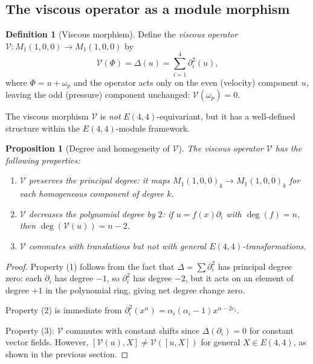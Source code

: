 \documentclass[reqno,10pt]{amsart}
\theoremstyle{plain}
\newtheorem{proposition}[theorem]{Proposition}
\theoremstyle{definition}
\newtheorem{definition}[theorem]{Definition}
\def\gE{E(4,4)}
\begin{document}
\subsection{The viscous operator as a module morphism}

\begin{definition}[Viscous morphism]
Define the \emph{viscous operator} $\mathcal{V}: M_1(1,0,0) \to M_1(1,0,0)$ by
\[
  \mathcal{V}(\Phi) = \Delta(u) = \sum_{i=1}^4 \partial_i^2(u),
\]
where $\Phi = u + \omega_p$ and the operator acts only on the even (velocity) component $u$, leaving the odd (pressure) component unchanged: $\mathcal{V}(\omega_p) = 0$.
\end{definition}

The viscous morphism $\mathcal{V}$ is \emph{not} $\gE$-equivariant, but it has a well-defined structure within the $\gE$-module framework.

\begin{proposition}[Degree and homogeneity of $\mathcal{V}$]
The viscous operator $\mathcal{V}$ has the following properties:
\begin{enumerate}
\item $\mathcal{V}$ preserves the principal degree: it maps $M_1(1,0,0)_k \to M_1(1,0,0)_k$ for each homogeneous component of degree $k$.
\item $\mathcal{V}$ decreases the polynomial degree by $2$: if $u = f(x)\partial_i$ with $\deg(f)=n$, then $\deg(\mathcal{V}(u)) = n-2$.
\item $\mathcal{V}$ commutes with translations but not with general $\gE$-transformations.
\end{enumerate}
\end{proposition}

\begin{proof}
Property (1) follows from the fact that $\Delta = \sum \partial_i^2$ has principal degree zero: each $\partial_i$ has degree $-1$, so $\partial_i^2$ has degree $-2$, but it acts on an element of degree $+1$ in the polynomial ring, giving net degree change zero.

Property (2) is immediate from $\partial_i^2(x^{\alpha}) = \alpha_i(\alpha_i-1)x^{\alpha-2e_i}$.

Property (3): $\mathcal{V}$ commutes with constant shifts since $\Delta(\partial_i) = 0$ for constant vector fields. However, $[\mathcal{V}(u), X] \neq \mathcal{V}([u,X])$ for general $X\in\gE$, as shown in the previous section.
\end{proof}
\end{document}
